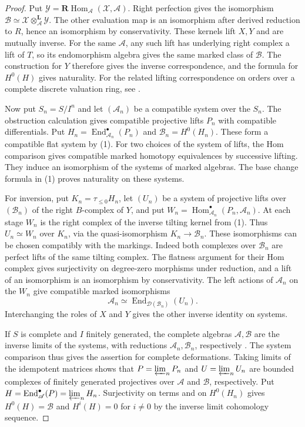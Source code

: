 \documentclass[12pt,a4paper,english,reqno]{amsart}
\numberwithin{equation}{section}
\theoremstyle{plain}
\theoremstyle{definition}
\begin{document}
\begin{proof}
Put $\mathcal Y=\mathbf R\operatorname{Hom}_{\mathcal A}
(\mathcal X,\mathcal A)$. Right perfection gives the
isomorphism $\mathcal B\simeq
\mathcal X\otimes_{\mathcal A}^{\mathbf L}\mathcal Y$.
The other evaluation map is an isomorphism after derived
reduction to $R$, hence an isomorphism by conservativity.
These kernels lift $X,Y$ and are mutually inverse.
For the same $\mathcal A$, any such lift has underlying right
complex a lift of $T$, so its endomorphism algebra gives the
same marked class of $\mathcal B$. The construction for $Y$
therefore gives the inverse correspondence, and the formula
for $H^0(H)$ gives naturality. For the related lifting
correspondence on orders over a complete discrete valuation
ring, see \cite[Proposition~3.6]{Eisele2012Lifting}.

Now put $S_n=S/I^n$ and let $(\mathcal A_n)$ be a compatible
system over the $S_n$. The obstruction calculation gives
compatible projective lifts $P_n$ with compatible differentials.
Put $H_n=\operatorname{End}_{\mathcal A_n}^\bullet(P_n)$ and
$\mathcal B_n=H^0(H_n)$. These form a compatible flat system
by (1). For two choices of the system of lifts, the Hom
comparison gives compatible marked homotopy equivalences by
successive lifting. They induce an isomorphism of the systems
of marked algebras. The base change formula in (1) proves
naturality on these systems.

For inversion, put $K_n=\tau_{\le0}H_n$, let $(U_n)$ be a system
of projective lifts over $(\mathcal B_n)$ of the right $B$-complex
of $Y$, and put
$W_n=\operatorname{Hom}_{\mathcal A_n}^\bullet(P_n,\mathcal A_n)$.
At each stage $W_n$ is the right complex of the inverse tilting
kernel from (1). Thus $U_n\simeq W_n$ over $K_n$, via the
quasi-isomorphism $K_n\to\mathcal B_n$. These isomorphisms can
be chosen compatibly with the markings. Indeed both complexes
over $\mathcal B_n$ are perfect lifts of the same tilting
complex. The flatness argument for their Hom complex gives
surjectivity on degree-zero morphisms under reduction, and a
lift of an isomorphism is an isomorphism by conservativity.
The left actions of $\mathcal A_n$ on the $W_n$ give compatible
marked isomorphisms
\[
 \mathcal A_n\simeq\operatorname{End}_{\mathcal D(\mathcal B_n)}(U_n).
\]
Interchanging the roles of $X$ and $Y$ gives the other inverse
identity on systems.

If $S$ is complete and $I$ finitely generated, the complete
algebras $\mathcal A,\mathcal B$ are the inverse limits of the
systems, with reductions $\mathcal A_n,\mathcal B_n$, respectively
\cite[Tag \texttt{09B8}]{StacksProject}. The system comparison
thus gives the assertion for complete deformations.
Taking limits of the idempotent matrices shows that $P=\varprojlim_n P_n$
and $U=\varprojlim_n U_n$ are bounded complexes of finitely generated
projectives over $\mathcal A$ and $\mathcal B$, respectively.
Put $H=\operatorname{End}_{\mathcal A}^\bullet(P)=\varprojlim_n H_n$.
Surjectivity on terms and on $H^0(H_n)$ gives $H^0(H)=\mathcal B$
and $H^i(H)=0$ for $i\ne0$ by the inverse limit cohomology sequence.


\end{proof}
\end{document}
